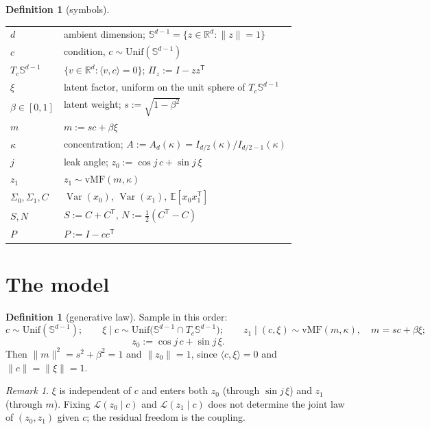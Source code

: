 \documentclass[11pt]{article}
\theoremstyle{definition}
\newtheorem{definition}[lemma]{Definition}
\theoremstyle{remark}
\newtheorem{remark}[lemma]{Remark}
\DeclareMathOperator{\Var}{Var}
\newcommand{\Sph}{\mathbb{S}^{d-1}}
\newcommand{\R}{\mathbb{R}}
\newcommand{\E}{\mathbb{E}}
\newcommand{\T}{\mathsf{T}}
\newcommand{\law}{\mathcal{L}}
\begin{document}
\begin{definition}[symbols]\label{def:symbols}
\begin{center}
\begin{tabular}{ll}
\toprule
$d$ & ambient dimension; $\Sph=\{z\in\R^{d}:\|z\|=1\}$\\
$c$ & condition, $c\sim\mathrm{Unif}(\Sph)$\\
$T_c\Sph$ & $\{v\in\R^d:\langle v,c\rangle=0\}$; $\Pi_z:=I-zz^{\T}$\\
$\xi$ & latent factor, uniform on the unit sphere of $T_c\Sph$\\
$\beta\in[0,1]$ & latent weight; $s:=\sqrt{1-\beta^{2}}$\\
$m$ & $m:=sc+\beta\xi$\\
$\kappa$ & concentration; $A:=A_d(\kappa)=I_{d/2}(\kappa)/I_{d/2-1}(\kappa)$\\
$j$ & leak angle; $z_0:=\cos j\,c+\sin j\,\xi$\\
$z_1$ & $z_1\sim\mathrm{vMF}(m,\kappa)$\\
$\Sigma_0,\Sigma_1,C$ & $\Var(x_0)$, $\Var(x_1)$, $\E[x_0x_1^{\T}]$\\
$S,N$ & $S:=C+C^{\T}$, $N:=\tfrac12(C^{\T}-C)$\\
$P$ & $P:=I-cc^{\T}$\\
\bottomrule
\end{tabular}
\end{center}
\end{definition}

\section{The model}\label{sec:model}

\begin{definition}[generative law]\label{def:model}
Sample in this order:
\[
c\sim\mathrm{Unif}(\Sph);
\qquad
\xi\mid c\sim\mathrm{Unif}\big(\Sph\cap T_c\Sph\big);
\qquad
z_1\mid(c,\xi)\sim\mathrm{vMF}(m,\kappa),\quad m=sc+\beta\xi;
\]
\[
z_0:=\cos j\,c+\sin j\,\xi.
\]
Then $\|m\|^{2}=s^{2}+\beta^{2}=1$ and $\|z_0\|=1$, since $\langle c,\xi\rangle=0$ and
$\|c\|=\|\xi\|=1$.
\end{definition}

\begin{remark}\label{rem:coupling}
$\xi$ is independent of $c$ and enters both $z_0$ (through $\sin j\,\xi$) and $z_1$ (through $m$).
Fixing $\law(z_0\mid c)$ and $\law(z_1\mid c)$ does not determine the joint law of $(z_0,z_1)$
given $c$; the residual freedom is the coupling.
\end{remark}
\end{document}
